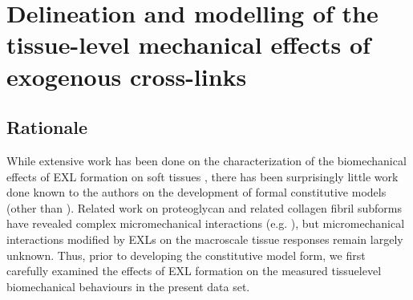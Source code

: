 \section{Delineation and modelling of the tissue-level mechanical effects of exogenous cross-links} \label{c3:sec:3}

\subsection{Rationale}

    While extensive work has been done on the characterization of the biomechanical effects of EXL formation on soft tissues \cite{sun_biaxial_2003,sacks_bioprosthetic_2006,sun_simulated_2005,sellaro_effects_2007,alferiev_prevention_2003,wells_cyclic_2005,wells_effects_2002,wells_effects_2000,wells_thermomechanical_1998,lee_high_1994,naimark_correlation_1992,lee_effect_2001,barber_mechanics_1999,mirnajafi_effects_2005}, there has been surprisingly little work done known to the authors on the development of formal constitutive models (other than \cite{sacks_structural_2000}). Related work on proteoglycan and related collagen fibril sub\Hyphdash forms have revealed complex micromechanical interactions (e.g. \cite{cavalcante_mechanical_2005,coughlin_dynamic_1996}), but micromechanical interactions modified by EXLs on the macroscale tissue responses remain largely unknown. Thus, prior to developing the constitutive model form, we first carefully examined the effects of EXL formation on the measured tissue\Hyphdash level biomechanical behaviours in the present data set.


